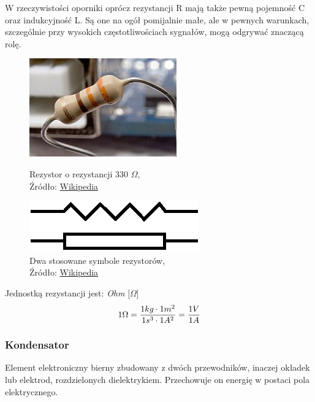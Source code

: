 \documentclass{article}
\begin{document}
        W rzeczywistości oporniki oprócz rezystancji R mają także pewną pojemność C oraz indukcyjność L. Są one na ogół pomijalnie małe, ale w pewnych warunkach, szczególnie przy wysokich częstotliwościach sygnałów, mogą odgrywać znaczącą rolę.

        \begin{figure}[!ht]
          \begin{minipage}{.5\textwidth}
              \centering
              \includegraphics[scale=0.5]{grafiki/Resistor.jpg}
              \caption{Rezystor o rezystancji 330 $\Omega$,
              \\Źródło: \href{https://pl.wikipedia.org/wiki/Plik:Resistor.jpg}{Wikipedia}}
          \end{minipage}
          \begin{minipage}{.5\textwidth}
              \centering
              \includegraphics[scale=1.75]{grafiki/Resistors.eps} 
              \caption{Dwa stosowane symbole rezystorów,
              \\Źródło: \href{https://upload.wikimedia.org/wikipedia/commons/2/25/Resistors.svg}{Wikipedia}}
          \end{minipage}
        \end{figure}
      
      
        Jednostką rezystancji jest: \textit{Ohm} [$\Omega$]
        \begin{equation}
          1 \Omega = \frac{1 kg \cdot 1 m \textsuperscript{2}}{1 s \textsuperscript{3} \cdot 1 A \textsuperscript{2}} = \frac{1 V}{1 A}
        \end{equation}


      \subsubsection{Kondensator}
        Element elektroniczny bierny zbudowany z dwóch przewodników, inaczej okładek lub elektrod, rozdzielonych dielektrykiem. Przechowuje on energię w postaci pola elektrycznego.
        
\end{document}
